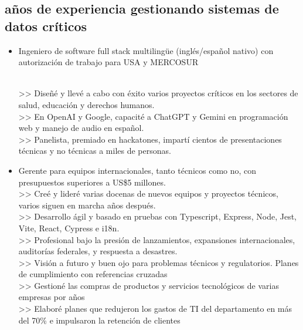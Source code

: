 \subsection{\number\numexpr{}\relax\space años de experiencia gestionando sistemas de datos críticos}
\vspace{\topsep}

\begin{itemize}

\item Ingeniero de software full stack multilingüe (inglés/español nativo) con autorización de trabajo para USA y MERCOSUR

    \\ >> Diseñé y llevé a cabo con éxito varios proyectos críticos en los sectores de salud, educación y derechos humanos.
    \\ >> En OpenAI y Google, capacité a ChatGPT y Gemini en programación web y manejo de audio en español.
    \\ >> Panelista, premiado en hackatones, impartí cientos de presentaciones técnicas y no técnicas a miles de personas.
    
\item Gerente para equipos internacionales, tanto técnicos como no, con presupuestos superiores a US\$5 millones.
    \\ >> Creé y lideré varias docenas de nuevos equipos y proyectos técnicos, varios siguen en marcha años después.
    \\ >> Desarrollo ágil y basado en pruebas con Typescript, Express, Node, Jest, Vite, React, Cypress e i18n.
    \\ >> Profesional bajo la presión de lanzamientos, expansiones internacionales, auditorías federales, y respuesta a desastres.
    \\ >> Visión a futuro y buen ojo para problemas técnicos y regulatorios. Planes de cumplimiento con referencias cruzadas
    \\ >> Gestioné las compras de productos y servicios tecnológicos de varias empresas por años
    \\ >> Elaboré planes que redujeron los gastos de TI del departamento en más del 70\% e impulsaron la retención de clientes


\end{itemize}
